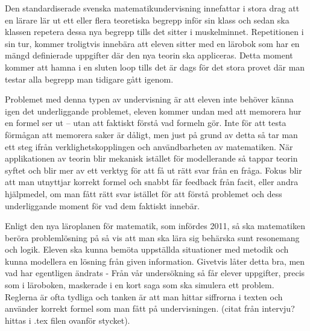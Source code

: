 \textcolor{WildStrawberry}{
    Den standardiserade svenska matematikundervisning innefattar i stora drag att en lärare lär ut ett eller flera teoretiska begrepp inför sin klass och sedan ska klassen repetera dessa nya begrepp tills det sitter i muskelminnet. Repetitionen i sin tur, kommer troligtvis innebära att eleven sitter med en lärobok som har en mängd definierade uppgifter där den nya teorin ska appliceras. Detta moment kommer att hamna i en sluten loop tills det är dags för det stora provet där man testar alla begrepp man tidigare gått igenom.
}

\textcolor{WildStrawberry}{
    Problemet med denna typen av undervisning är att eleven inte behöver känna igen det underliggande problemet, eleven kommer undan med att memorera hur en formel ser ut – utan att faktiskt förstå vad formeln gör. Inte för att testa förmågan att memorera saker är dåligt, men just på grund av detta så tar man ett steg ifrån verklighetskopplingen och användbarheten av matematiken. När applikationen av teorin blir mekanisk istället för modellerande så tappar teorin syftet och blir mer av ett verktyg för att få ut rätt svar från en fråga. Fokus blir att man utnyttjar korrekt formel och snabbt får feedback från facit, eller andra hjälpmedel, om man fått rätt svar istället för att förstå problemet och dess underliggande moment för vad dem faktiskt innebär.
}



\textcolor{WildStrawberry}{
    Enligt den nya läroplanen för matematik, som infördes 2011, så ska matematiken beröra problemlösning på så vis att man ska lära sig behärska sunt resonemang och logik. Eleven ska kunna bemöta uppställda situationer med metodik och kunna modellera en lösning från given information. Givetvis låter detta bra, men vad har egentligen ändrats - Från vår undersökning så får elever uppgifter, precis som i läroboken, maskerade i en kort saga som ska simulera ett problem. Reglerna är ofta tydliga och tanken är att man hittar siffrorna i texten och använder korrekt formel som man fått på undervisningen. (citat från intervju? hittas i .tex filen ovanför stycket).
}

